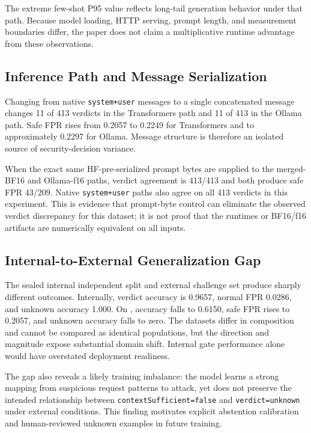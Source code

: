 
The extreme few-shot P95 value reflects long-tail generation behavior under that path. Because model loading, HTTP serving, prompt length, and measurement boundaries differ, the paper does not claim a multiplicative runtime advantage from these observations.

\subsection{Inference Path and Message Serialization}
Changing from native \texttt{system+user} messages to a single concatenated message changes 11 of 413 verdicts in the Transformers path and 11 of 413 in the Ollama path. Safe FPR rises from 0.2057 to 0.2249 for Transformers and to approximately 0.2297 for Ollama. Message structure is therefore an isolated source of security-decision variance.

When the exact same HF-pre-serialized prompt bytes are supplied to the merged-BF16 and Ollama-f16 paths, verdict agreement is 413/413 and both produce safe FPR 43/209. Native \texttt{system+user} paths also agree on all 413 verdicts in this experiment. This is evidence that prompt-byte control can eliminate the observed verdict discrepancy for this dataset; it is not proof that the runtimes or BF16/f16 artifacts are numerically equivalent on all inputs.


\subsection{Internal-to-External Generalization Gap}
The sealed internal independent split and external challenge set produce sharply different outcomes. Internally, verdict accuracy is 0.9657, normal FPR 0.0286, and unknown accuracy 1.000. On \challenge{}, accuracy falls to 0.6150, safe FPR rises to 0.2057, and unknown accuracy falls to zero. The datasets differ in composition and cannot be compared as identical populations, but the direction and magnitude expose substantial domain shift. Internal gate performance alone would have overstated deployment readiness.

The gap also reveals a likely training imbalance: the model learns a strong mapping from suspicious request patterns to attack, yet does not preserve the intended relationship between \texttt{contextSufficient=false} and \texttt{verdict=unknown} under external conditions. This finding motivates explicit abstention calibration and human-reviewed unknown examples in future training.
